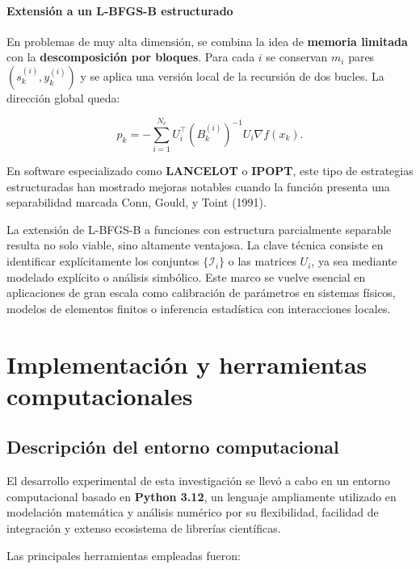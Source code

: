 \documentclass[
  spanish,
  us-letterpaper,
  DIV=11,
  numbers=noendperiod]{scrreprt}
\numberwithin{equation}{section}
\begin{document}
\subsubsection{Extensión a un L-BFGS-B
estructurado}\label{extensiuxf3n-a-un-l-bfgs-b-estructurado}

En problemas de muy alta dimensión, se combina la idea de
\textbf{memoria limitada} con la \textbf{descomposición por bloques}.
Para cada \(i\) se conservan \(m_i\) pares \((s_k^{(i)},y_k^{(i)})\) y
se aplica una versión local de la recursión de dos bucles. La dirección
global queda:

\[
p_k = -\sum_{i=1}^{N_e} U_i^\top (B_k^{(i)})^{-1} U_i \nabla f(x_k).
\tag{3.145}
\]

En software especializado como \textbf{LANCELOT} o \textbf{IPOPT}, este
tipo de estrategias estructuradas han mostrado mejoras notables cuando
la función presenta una separabilidad marcada Conn, Gould, y Toint
(1991).

La extensión de L-BFGS-B a funciones con estructura parcialmente
separable resulta no solo viable, sino altamente ventajosa. La clave
técnica consiste en identificar explícitamente los conjuntos
\(\{\mathcal{I}_i\}\) o las matrices \(U_i\), ya sea mediante modelado
explícito o análisis simbólico. Este marco se vuelve esencial en
aplicaciones de gran escala como calibración de parámetros en sistemas
físicos, modelos de elementos finitos o inferencia estadística con
interacciones locales.


\chapter{Implementación y herramientas
computacionales}\label{implementaciuxf3n-y-herramientas-computacionales}

\section{Descripción del entorno
computacional}\label{descripciuxf3n-del-entorno-computacional}

El desarrollo experimental de esta investigación se llevó a cabo en un
entorno computacional basado en \textbf{Python 3.12}, un lenguaje
ampliamente utilizado en modelación matemática y análisis numérico por
su flexibilidad, facilidad de integración y extenso ecosistema de
librerías científicas.

Las principales herramientas empleadas fueron:
\end{document}
